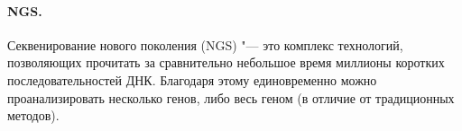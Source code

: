 \documentclass[a4paper,12pt]{article}
\begin{document}
% 

\paragraph{NGS.}
Секвенирование нового поколения (NGS) "--- это комплекс технологий, позволяющих прочитать за сравнительно небольшое время миллионы коротких последовательностей ДНК.
Благодаря этому единовременно можно проанализировать несколько генов, либо весь геном (в отличие от традиционных методов).
\end{document}

